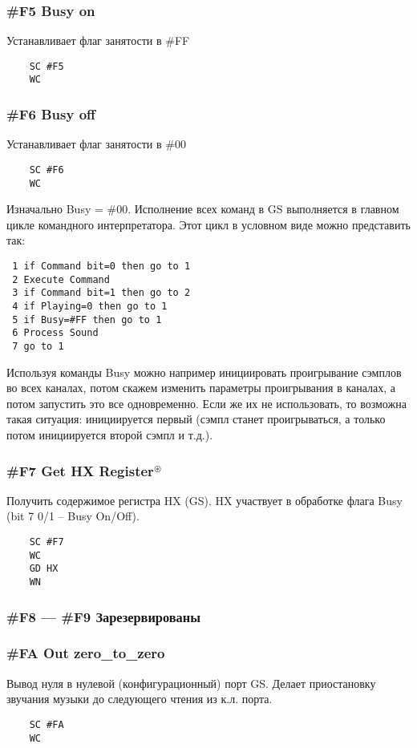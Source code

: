 \documentclass[a4paper,11pt]{article}
\DeclareRobustCommand{\Cyrax}{\texorpdfstring{\(^\circledast\)}{\circledast}}
\begin{document}
\subsubsection{\#F5 Busy on}
Устанавливает флаг занятости в \#FF
\begin{verbatim}
    SC #F5
    WC
\end{verbatim}

\subsubsection{\#F6 Busy off}
Устанавливает флаг занятости в \#00
\begin{verbatim}
    SC #F6
    WC
\end{verbatim}

Изначально Busy = \#00. Исполнение всех команд в GS выполняется в  главном цикле командного интерпретатора. Этот цикл в условном виде можно представить так:
\begin{verbatim}
 1 if Command bit=0 then go to 1
 2 Execute Command
 3 if Command bit=1 then go to 2
 4 if Playing=0 then go to 1
 5 if Busy=#FF then go to 1
 6 Process Sound
 7 go to 1
\end{verbatim}

Используя команды Busy можно например инициировать проигрывание сэмплов во всех каналах, потом скажем изменить параметры проигрывания в каналах, а потом запустить это все одновременно. Если же их не использовать, то возможна такая ситуация: инициируется первый (сэмпл станет проигрываться, а только потом инициируется второй сэмпл и т.д.).

\subsubsection{\#F7 Get HX Register\Cyrax}
Получить содержимое регистра HX (GS).
HX участвует в обработке флага Busy (bit 7 0/1 – Busy On/Off).
\begin{verbatim}
    SC #F7
    WC
    GD HX
    WN
\end{verbatim}

\subsubsection{\#F8 --- \#F9 Зарезервированы}

\subsubsection{\#FA Out zero\_to\_zero}
Вывод нуля в нулевой (конфигурационный) порт GS. Делает приостановку звучания музыки до следующего чтения из к.л. порта.
\begin{verbatim}
    SC #FA
    WC
\end{verbatim}
\end{document}
